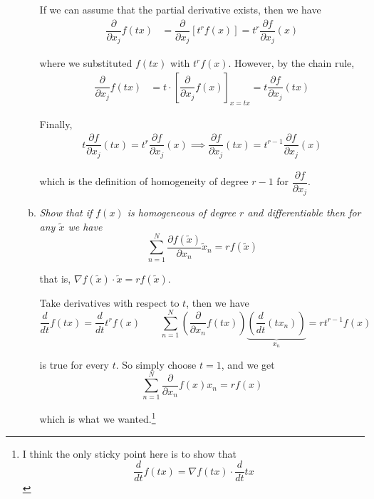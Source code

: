 \documentclass{article}
\begin{document}
\begin{enumerate}[1.]
\begin{enumerate}[a)]
        \solution If we can assume that the partial derivative exists, then we have
        \begin{align*}
          \dfrac{\partial}{\partial x_j} f(tx) & = \dfrac{\partial}{\partial x_j} \left[t^r f(x)\right] = t^r \dfrac{\partial f}{\partial x_j}(x)
        \end{align*}

        where we substituted $f(tx)$ with $t^r f(x)$. However, by the chain rule,
        \begin{align*}
          \dfrac{\partial}{\partial x_j} f(tx) & = t \cdot \left[\dfrac{\partial}{\partial x_j} f(x)\right]_{x = tx} = t \dfrac{\partial f}{\partial x_j}(tx)
        \end{align*}

        Finally,
        \begin{align*}
          t \dfrac{\partial f}{\partial x_j}(tx)
          =
          t^r \dfrac{\partial f}{\partial x_j}(x)
          \implies
          \dfrac{\partial f}{\partial x_j}(tx) = t^{r - 1} \dfrac{\partial f}{\partial x_j}(x)
        \end{align*}

        which is the definition of homogeneity of degree $r - 1$ for $\dfrac{\partial f}{\partial x_j}$.

      \item {\itshape
          Show that if $f(x)$ is homogeneous of degree $r$ and differentiable  then for any $\widetilde{x}$ we have
        \[
          \sum^{N}_{n = 1} \dfrac{\partial f(\widetilde{x})}{\partial x_n} \widetilde{x}_n = r f(\widetilde{x})
        \]

        that is, $\nabla f(\widetilde{x}) \cdot \widetilde{x} = r f(\widetilde{x})$.}

      \solution Take derivatives with respect to $t$, then we have
        \[
          \dfrac{d}{dt} f(tx)
            = \dfrac{d}{dt} t^r f(x)
          \quad\quad
          \sum^{N}_{n = 1}
          \left(\dfrac{\partial}{\partial x_n} f(tx)\right)
          \underbrace{\left(\dfrac{d}{dt} (t x_n)\right)}_{x_n}
            = r t^{r - 1} f(x)
        \]

        is true for every $t$. So simply choose $t = 1$, and we get
        \[
          \sum^{N}_{n = 1} \dfrac{\partial}{\partial x_n} f(x) x_n = r f(x)
        \]

        which is what we wanted.\footnote{I think the only sticky point here is to show that
        \[
          \dfrac{d}{dt}f(tx) = \nabla f(tx) \cdot \dfrac{d}{dt} tx
        \]

}
\end{enumerate}
\end{enumerate}
\end{document}

